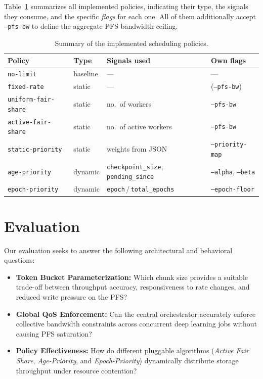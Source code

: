 \documentclass[sigplan,twocolumn,10pt,nonacm]{acmart}
\begin{document}
Table~\ref{tab:policies-summary} summarizes all implemented policies, indicating their type, the signals they consume, and the specific \textit{flags} for each one. All of them additionally accept \texttt{--pfs-bw} to define the aggregate PFS bandwidth ceiling.

\begin{table}[h]
    \centering
    \scriptsize
    \setlength{\tabcolsep}{3pt}
    \begin{tabular}{llll}
        \toprule
        \textbf{Policy} & \textbf{Type} & \textbf{Signals used} & \textbf{Own flags} \\
        \midrule
        \texttt{no-limit}           & baseline & ---                                       & ---                  \\
        \texttt{fixed-rate}         & static   & ---                                       & (\texttt{--pfs-bw})  \\
        \texttt{uniform-fair-share} & static   & no.\ of workers                           & \texttt{--pfs-bw}    \\
        \texttt{active-fair-share}  & static   & no.\ of active workers                    & \texttt{--pfs-bw}    \\
        \texttt{static-priority}    & static   & weights from JSON                         & \texttt{--priority-map} \\
        \texttt{age-priority}       & dynamic  & \texttt{checkpoint\_size}, \texttt{pending\_since} & \texttt{--alpha}, \texttt{--beta} \\
        \texttt{epoch-priority}     & dynamic  & \texttt{epoch}\,/\,\texttt{total\_epochs} & \texttt{--epoch-floor} \\
        \bottomrule
    \end{tabular}
    \caption{Summary of the implemented scheduling policies.}
    \label{tab:policies-summary}
\end{table}

\section{Evaluation}

Our evaluation seeks to answer the following architectural and behavioral questions:

\begin{itemize}
    \item \textbf{Token Bucket Parameterization:} Which chunk size provides a
        suitable trade-off between throughput accuracy, responsiveness to rate
        changes, and reduced write pressure on the PFS?
    \item \textbf{Global QoS Enforcement:} Can the central orchestrator
        accurately enforce collective bandwidth constraints across concurrent
        deep learning jobs without causing PFS saturation?
    \item \textbf{Policy Effectiveness:} How do different pluggable algorithms
        (\textit{Active Fair Share}, \textit{Age-Priority}, and
        \textit{Epoch-Priority}) dynamically distribute storage throughput under
        resource contention?
\end{itemize}
\end{document}
